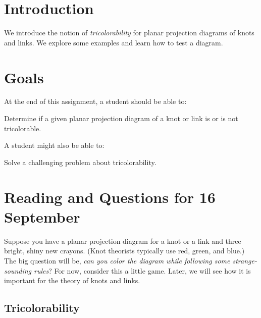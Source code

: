 \documentclass[12pt,letterpaper]{article}
\theoremstyle{definition}
\begin{document}
\setlength{\parskip}{1ex plus 0.5ex minus 0.2ex}
\setlength{\parindent}{0pt}

\pagestyle{fancy}
\cfoot{}

\section*{Introduction}
We introduce the notion of \emph{tricolorability} for planar projection diagrams of knots and links. 
We explore some examples and learn how to test a diagram.

\section*{Goals}
At the end of this assignment, a student should be able to:
\begin{compactitem}
\item Determine if a given planar projection diagram of a knot or link is or is not tricolorable.
\end{compactitem}
A student might also be able to:
\begin{compactitem}
\item Solve a challenging problem about tricolorability.
\end{compactitem}

\section*{Reading and Questions for 16 September}

Suppose you have a planar projection diagram for a knot or a link and three bright, shiny new crayons.
(Knot theorists typically use red, green, and blue.)
The big question will be, \emph{can you color the diagram while following some strange-sounding rules}?
For now, consider this a little game.
Later, we will see how it is important for the theory of knots and links.

\subsection*{Tricolorability}
\end{document}
